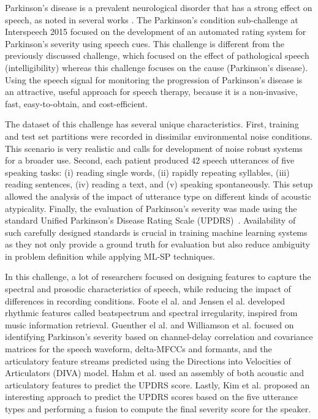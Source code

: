 \documentclass{article}
\begin{document}
Parkinson's disease is a prevalent neurological disorder that has a strong effect on speech, as noted in several works \cite{lieberman1992speech,kempler2002effect}. The Parkinson's condition sub-challenge at Interspeech 2015 focused on the development of an automated rating system for Parkinson's severity using speech cues. This challenge is different from the previously discussed challenge, which focused on the effect of pathological speech (intelligibility) whereas this challenge focuses on the cause (Parkinson's disease). Using the speech signal for monitoring the progression of Parkinson's disease is an attractive, useful approach for speech therapy, because it is a non-invasive, fast, easy-to-obtain, and cost-efficient.

The dataset of this challenge has several unique characteristics. First, training and test set partitions were recorded in dissimilar environmental noise conditions. This scenario is very realistic and calls for development of noise robust systems for a broader use. Second, each patient produced 42 speech utterances of five speaking tasks: (i) reading single words, (ii) rapidly repeating syllables, (iii) reading sentences, (iv) reading a text, and (v) speaking spontaneously. This setup allowed the analysis of the impact of utterance type on different kinds of acoustic atypicality. Finally, the evaluation of Parkinson's severity was made using the standard Unified Parkinson's Disease Rating Scale (UPDRS)~\cite{stebbins1998factor}. Availability of such carefully designed standards is crucial in training machine learning systems as they not only provide a ground truth for evaluation but also reduce ambiguity in problem definition while applying ML-SP techniques.

In this challenge, a lot of researchers focused on designing features to capture the spectral and prosodic characteristics of speech, while reducing the impact of differences in recording conditions.
Foote el al. \cite{foote2002audio} and Jensen el al. \cite{jensen1999timbre} developed rhythmic features called beatspectrum and spectral irregularity, inspired from music information retrieval. Guenther el al. \cite{guenther2006neural} and Williamson et al. \cite{williamson2015segment} focused on identifying Parkinson's severity based on channel-delay correlation and covariance matrices for the speech waveform, delta-MFCCs and formants, and the articulatory feature streams predicted using the Directions into Velocities of Articulators (DIVA) model. Hahm et al. \cite{hahm2015parkinson} used an assembly of both acoustic and articulatory features to predict the UPDRS score. Lastly, Kim et al. \cite{kim2015automatic} proposed an interesting approach to predict the UPDRS scores based on the five utterance types and performing a fusion to compute the final severity score for the speaker.
\end{document}
